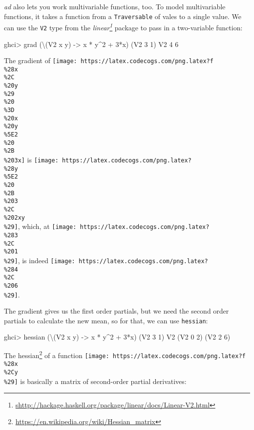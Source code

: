 \documentclass[]{article}
\newenvironment{Shaded}{}{}
\newcommand{\DataTypeTok}[1]{\textcolor[rgb]{0.56,0.13,0.00}{#1}}
\newcommand{\DecValTok}[1]{\textcolor[rgb]{0.25,0.63,0.44}{#1}}
\newcommand{\OtherTok}[1]{\textcolor[rgb]{0.00,0.44,0.13}{#1}}
\newcommand{\FunctionTok}[1]{\textcolor[rgb]{0.02,0.16,0.49}{#1}}
\newcommand{\NormalTok}[1]{#1}
\renewcommand{\href}[2]{#2\footnote{\url{#1}}}
\begin{document}
\emph{ad} also lets you work multivariable functions, too. To model
multivariable functions, it takes a function from a \texttt{Traversable} of
vales to a single value. We can use the \texttt{V2} type from the
\emph{\href{shttp://hackage.haskell.org/package/linear/docs/Linear-V2.html}{linear}}
package to pass in a two-variable function:

\begin{Shaded}
\begin{Highlighting}[]
\NormalTok{ghci}\FunctionTok{>}\NormalTok{ grad (\textbackslash{}(}\DataTypeTok{V2}\NormalTok{ x y) }\OtherTok{->}\NormalTok{ x }\FunctionTok{*}\NormalTok{ y}\FunctionTok{^}\DecValTok{2} \FunctionTok{+} \DecValTok{3}\FunctionTok{*}\NormalTok{x) (}\DataTypeTok{V2} \DecValTok{3} \DecValTok{1}\NormalTok{)}
\DataTypeTok{V2} \DecValTok{4} \DecValTok{6}
\end{Highlighting}
\end{Shaded}

The gradient of
\texttt{[image: https://latex.codecogs.com/png.latex?f\\\%28x\\\%2C\\\%20y\\\%29\\\%20\\\%3D\\\%20x\\\%20y\\\%5E2\\\%20\\\%2B\\\%203x]}
is
\texttt{[image: https://latex.codecogs.com/png.latex?\\\%28y\\\%5E2\\\%20\\\%2B\\\%203\\\%2C\\\%202xy\\\%29]},
which, at
\texttt{[image: https://latex.codecogs.com/png.latex?\\\%283\\\%2C\\\%201\\\%29]}, is
indeed
\texttt{[image: https://latex.codecogs.com/png.latex?\\\%284\\\%2C\\\%206\\\%29]}.

The gradient gives us the first order partials, but we need the second order
partials to calculate the new mean, so for that, we can use \texttt{hessian}:

\begin{Shaded}
\begin{Highlighting}[]
\NormalTok{ghci}\FunctionTok{>}\NormalTok{ hessian (\textbackslash{}(}\DataTypeTok{V2}\NormalTok{ x y) }\OtherTok{->}\NormalTok{ x }\FunctionTok{*}\NormalTok{ y}\FunctionTok{^}\DecValTok{2} \FunctionTok{+} \DecValTok{3}\FunctionTok{*}\NormalTok{x) (}\DataTypeTok{V2} \DecValTok{3} \DecValTok{1}\NormalTok{)}
\DataTypeTok{V2}\NormalTok{ (}\DataTypeTok{V2} \DecValTok{0} \DecValTok{2}\NormalTok{)}
\NormalTok{   (}\DataTypeTok{V2} \DecValTok{2} \DecValTok{6}\NormalTok{)}
\end{Highlighting}
\end{Shaded}

The \href{https://en.wikipedia.org/wiki/Hessian_matrix}{hessian} of a function
\texttt{[image: https://latex.codecogs.com/png.latex?f\\\%28x\\\%2Cy\\\%29]} is
basically a matrix of second-order partial derivatives:
\end{document}
